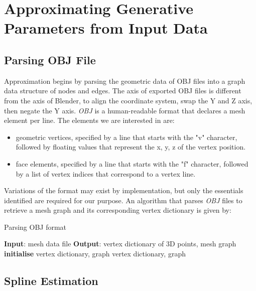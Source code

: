 \documentclass[ %
author={Dillon Keith Diep},
supervisor={Dr. Carl Henrik Ek},
degree={MEng},
title={ART-CG:},
subtitle={Assisted Real-time Content Generation of 3D Hair by Learning Manifolds},
type={Research},
year={2017} ]{dissertation}
\begin{document}
\section{Approximating Generative Parameters from Input Data}
\subsection{Parsing OBJ File}
Approximation begins by parsing the geometric data of OBJ files into a graph data structure of nodes and edges. The axis of exported OBJ files is different from the axis of Blender, to align the coordinate system, swap the Y and Z axis, then negate the Y axis. \textit{OBJ} is a human-readable format that declares a mesh element per line. The elements we are interested in are:
\begin{itemize}
	\item geometric vertices, specified by a line that starts with the "v" character, followed by floating values that represent the x, y, z of the vertex position.
	\item face elements, specified by a line that starts with the "f" character, followed by a list of vertex indices that correspond to a vertex line.
\end{itemize}
Variations of the format may exist by implementation, but only the essentials identified are required for our purpose. An algorithm that parses \textit{OBJ} files to retrieve a mesh graph and its corresponding vertex dictionary is given by:

\begin{algorithm}[!h]
	\caption{Parsing OBJ format}
	\algrule
	\textbf{Input}: mesh data file\;
	\textbf{Output}: vertex dictionary of 3D points, mesh graph\;
	\algrule
	\textbf{initialise} vertex dictionary, graph\;
	\Return vertex dictionary, graph
\end{algorithm}

\subsection{Spline Estimation}
\end{document}
